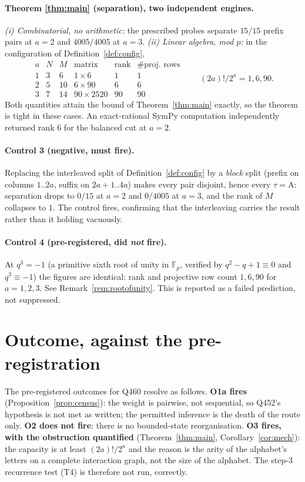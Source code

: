 \documentclass[11pt]{article}
\theoremstyle{plain}
\theoremstyle{definition}
\begin{document}
\paragraph{Theorem \ref{thm:main} (separation), two independent engines.}
\emph{(i) Combinatorial, no arithmetic:} the prescribed probes separate
$15/15$ prefix pairs at $a=2$ and $4005/4005$ at $a=3$.
\emph{(ii) Linear algebra, mod $p$:} in the configuration of
Definition~\ref{def:config},
\[
\begin{array}{cccccc}
a & N & M & \text{matrix} & \operatorname{rank} & \#\text{proj.\ rows}\\
1 & 3 & 6 & 1\times6 & 1 & 1\\
2 & 5 & 10 & 6\times90 & 6 & 6\\
3 & 7 & 14 & 90\times2520 & 90 & 90
\end{array}
\qquad (2a)!/2^{a}=1,6,90 .
\]
Both quantities attain the bound of Theorem~\ref{thm:main} exactly, so the
theorem is tight in these cases. An exact-rational SymPy computation
independently returned rank $6$ for the balanced cut at $a=2$.

\paragraph{Control 3 (negative, must fire).}
Replacing the interleaved split of Definition~\ref{def:config} by a
\emph{block} split (prefix on columns $1..2a$, suffix on $2a+1..4a$) makes every
pair disjoint, hence every $\tau=\mathrm A$: separation drops to $0/15$ at
$a=2$ and $0/4005$ at $a=3$, and the rank of $M$ collapses to $1$. The control
fires, confirming that the interleaving carries the result rather than it
holding vacuously.

\paragraph{Control 4 (pre-registered, did \emph{not} fire).}
At $q^{3}=-1$ (a primitive sixth root of unity in $\mathbb F_p$, verified by
$q^2-q+1\equiv0$ and $q^3\equiv-1$) the figures are identical: rank and
projective row count $1,6,90$ for $a=1,2,3$. See Remark~\ref{rem:rootofunity}.
This is reported as a failed prediction, not suppressed.

\section{Outcome, against the pre-registration}

The pre-registered outcomes for Q460 resolve as follows.
\textbf{O1a fires} (Proposition~\ref{prop:census}): the weight is pairwise, not
sequential, so Q452's hypothesis is not met as written; the permitted inference
is the death of the route only.
\textbf{O2 does not fire}: there is no bounded-state reorganisation.
\textbf{O3 fires, with the obstruction quantified} (Theorem~\ref{thm:main},
Corollary~\ref{cor:mech}): the capacity is at least $(2a)!/2^{a}$ and the
reason is the arity of the alphabet's letters on a complete interaction graph,
not the size of the alphabet. The step-3 recurrence test (T4) is therefore not
run, correctly.
\end{document}
